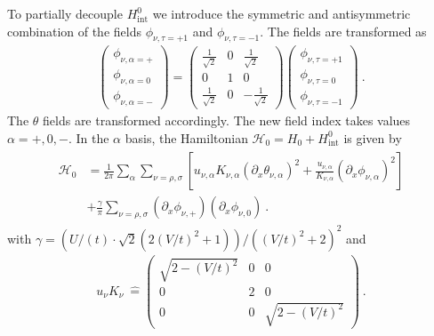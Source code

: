 \documentclass[twocolumn, prl, aps, floatfix, superscriptaddress, longbibliography]{revtex4-1}
\begin{document}
To partially decouple $H_{\text{int}}^0$ we introduce the symmetric and antisymmetric combination of the fields $\phi_{\nu, \tau=+1}$ and $\phi_{\nu, \tau=-1}$. The fields are transformed as
%
\begin{align} \label{eq:TrafoO2}
	\left(\begin{array}{c}
		\phi_{\nu,\alpha=+} \\
		\phi_{\nu,\alpha=0}  \\
		\phi_{\nu,\alpha=-} 
	\end{array}\right)
	= \left(
		\begin{array}{ccc}
			\frac{1}{\sqrt{2}} & 0 & \frac{1}{\sqrt{2}} \\
			0 & 1 & 0 \\
			\frac{1}{\sqrt{2}} & 0 & -\frac{1}{\sqrt{2}}
		\end{array}
		\right)
	\left(\begin{array}{c}
		\phi_{\nu,\tau =+1} \\
		\phi_{\nu,\tau =0} \\
		\phi_{\nu,\tau =-1}
	\end{array}\right) \ .
\end{align}
%
The $\theta$ fields are transformed accordingly. The new field index takes values $\alpha=+,0,-$. In the $\alpha$ basis, the Hamiltonian $\mathcal{H}_0 = H_0 + H^0_{\text{int}}$ is given by
%
\begin{align} \label{eq:BosonizedHamiltonianI}
	\begin{split}
		\mathcal{H}_0 &=  \frac{1}{2\pi}\sum_{\alpha} \sum_{\nu = \rho,\sigma}  \left[ u_{\nu,\alpha}K_{\nu,\alpha}\left(\partial_x \theta_{\nu, \alpha}\right)^2 + \frac{u_{\nu,\alpha}}{K_{\nu,\alpha}} \left(\partial_x \phi_{\nu, \alpha}\right)^2\right] \\
		&+ \frac{\gamma}{\pi} \sum_{\nu = \rho,\sigma}   \left(\partial_x \phi_{\nu,+} \right)  \left(\partial_x \phi_{\nu,0} \right)   \ .
	\end{split}
\end{align}
%
with $\gamma = \left( U /(t) \cdot \sqrt{2}\left(2 (V/t)^2+1\right)\right)/\left((V/t)^2+2\right)^2$ and 
%
\begin{align}
	u_{\nu}K_{\nu}\ \hat{=}  \left(
		\begin{array}{ccc}
			\sqrt{2-(V/t)^2} & 0 & 0 \\
			0 & 2 & 0 \\
			0 & 0 & \sqrt{2-(V/t)^2}
		\end{array}
		\right) \ .
\end{align}
\end{document}
